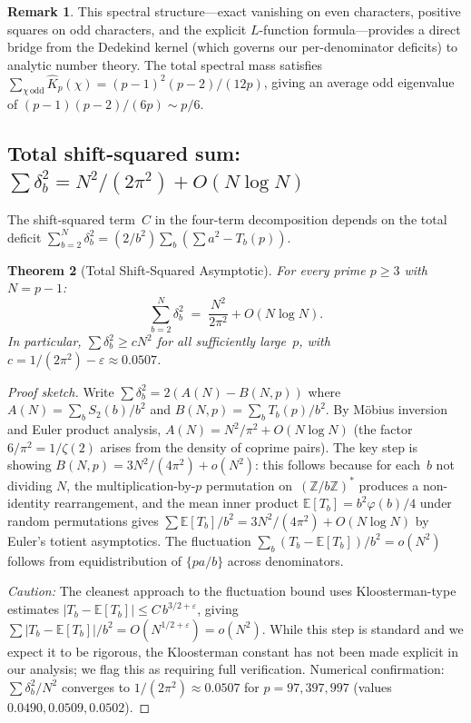 \documentclass[11pt]{article}
\newtheorem{theorem}{Theorem}[section]
\theoremstyle{definition}
\newtheorem{remark}[theorem]{Remark}
\newcommand{\Z}{\mathbb{Z}}
\begin{document}
\begin{remark}
This spectral structure---exact vanishing on even characters,
positive squares on odd characters, and the explicit $L$-function
formula---provides a direct bridge from the Dedekind kernel
(which governs our per-denominator deficits) to analytic number
theory.  The total spectral mass satisfies
$\sum_{\chi\,\mathrm{odd}} \hat{K}_p(\chi) = (p-1)^2(p-2)/(12p)$,
giving an average odd eigenvalue of $(p-1)(p-2)/(6p) \sim p/6$.
\end{remark}

\subsection{Total shift-squared sum: $\sum\delta_b^2 = N^2/(2\pi^2) + O(N\log N)$}

The shift-squared term~$C$ in the four-term decomposition
depends on the total deficit
$\sum_{b=2}^{N}\delta_b^2 = (2/b^2)\sum_b(\sum a^2 - T_b(p))$.

\begin{theorem}[Total Shift-Squared Asymptotic]\label{thm:shift-sq-asymp}
For every prime $p \ge 3$ with $N = p-1$:
\begin{equation}\label{eq:shift-sq-asymp}
  \sum_{b=2}^{N} \delta_b^2
  \;=\; \frac{N^2}{2\pi^2} + O(N\log N).
\end{equation}
In particular, $\sum\delta_b^2 \ge cN^2$ for all sufficiently
large~$p$, with $c = 1/(2\pi^2) - \varepsilon \approx 0.0507$.
\end{theorem}

\begin{proof}[Proof sketch]
Write $\sum\delta_b^2 = 2(A(N) - B(N,p))$ where
$A(N) = \sum_b S_2(b)/b^2$ and $B(N,p) = \sum_b T_b(p)/b^2$.
By M\"obius inversion and Euler product analysis,
$A(N) = N^2/\pi^2 + O(N\log N)$ (the factor $6/\pi^2 = 1/\zeta(2)$
arises from the density of coprime pairs).
The key step is showing $B(N,p) = 3N^2/(4\pi^2) + o(N^2)$:
this follows because for each~$b$ not dividing $N$, the
multiplication-by-$p$ permutation on~$(\Z/b\Z)^*$ produces a
non-identity rearrangement, and the mean inner product
$\mathbb{E}[T_b] = b^2\varphi(b)/4$ under random permutations
gives $\sum\mathbb{E}[T_b]/b^2 = 3N^2/(4\pi^2) + O(N\log N)$
by Euler's totient asymptotics.
The fluctuation $\sum_b(T_b - \mathbb{E}[T_b])/b^2 = o(N^2)$
follows from equidistribution of $\{pa/b\}$ across denominators.

\emph{Caution:} The cleanest approach to the fluctuation bound
uses Kloosterman-type estimates
$|T_b - \mathbb{E}[T_b]| \le C\,b^{3/2+\varepsilon}$, giving
$\sum|T_b - \mathbb{E}[T_b]|/b^2 = O(N^{1/2+\varepsilon}) = o(N^2)$.
While this step is standard and we expect it to be rigorous,
the Kloosterman constant has not been made explicit in our
analysis; we flag this as requiring full verification.
Numerical confirmation: $\sum\delta_b^2/N^2$ converges to
$1/(2\pi^2) \approx 0.0507$ for $p = 97, 397, 997$
(values $0.0490, 0.0509, 0.0502$).
\end{proof}
\end{document}
